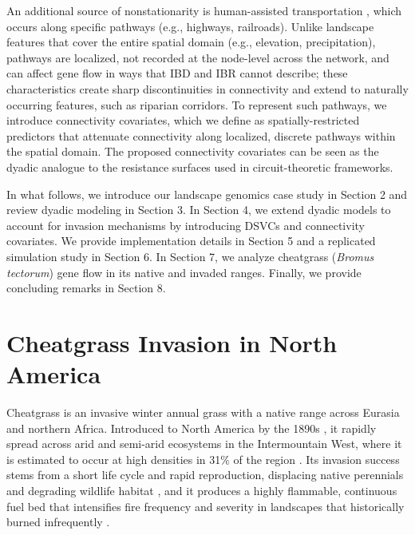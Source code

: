 \documentclass{article}
\begin{document}
An additional source of nonstationarity is human-assisted transportation \citep{medley2015human}, which occurs along specific pathways (e.g., highways, railroads). 
Unlike landscape features that cover the entire spatial domain (e.g., elevation, precipitation), pathways are localized, not recorded at the node-level across the network, and can affect gene flow in ways that IBD and IBR cannot describe; these characteristics create sharp discontinuities in connectivity \citep{goel2025mechanistic} and extend to naturally occurring features, such as riparian corridors.
To represent such pathways, we introduce connectivity covariates, which we define as spatially-restricted predictors that attenuate connectivity along localized, discrete pathways within the spatial domain.
The proposed connectivity covariates can be seen as the dyadic analogue to the resistance surfaces used in circuit-theoretic frameworks.

In what follows, we introduce our landscape genomics case study in Section 2 and review dyadic modeling in Section 3. In Section 4, we extend dyadic models to account for invasion mechanisms by introducing DSVCs and connectivity covariates. We provide implementation details in Section 5 and a replicated simulation study in Section 6. In Section 7, we analyze cheatgrass (\textit{Bromus tectorum}) gene flow in its native and invaded ranges. Finally, we provide concluding remarks in Section 8.

\section{Cheatgrass Invasion in North America}

Cheatgrass is an invasive winter annual grass with a native range across Eurasia and northern Africa. Introduced to North America by the 1890s \citep{mack1981invasion}, it rapidly spread across arid and semi-arid ecosystems in the Intermountain West, where it is estimated to occur at high densities in 31\% of the region \citep{bradley2018cheatgrass}. Its invasion success stems from a short life cycle and rapid reproduction, displacing native perennials and degrading wildlife habitat \citep{porensky2016historical}, and it produces a highly flammable, continuous fuel bed that intensifies fire frequency and severity in landscapes that historically burned infrequently \citep{germino2016ecosystem}. 
\end{document}
